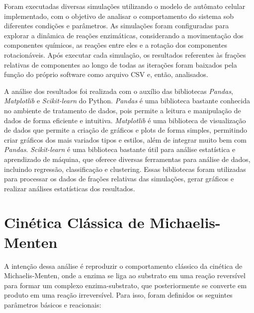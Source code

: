 \documentclass[12pt,oneside]{report}
\begin{document}
Foram executadas diversas simulações utilizando o modelo de autômato celular implementado, com o objetivo de analisar o comportamento do sistema sob diferentes condições e parâmetros. As simulações foram configuradas para explorar a dinâmica de reações enzimáticas, considerando a movimentação dos componentes químicos, as reações entre eles e a rotação dos componentes rotacionáveis. Após executar cada simulação, os resultados referentes às frações relativas de componentes ao longo de todas as iterações foram baixados pela função do próprio software como arquivo CSV e, então, analisados.

A análise dos resultados foi realizada com o auxílio das bibliotecas \textit{Pandas}, \textit{Matplotlib} e \textit{Scikit-learn} do Python. \textit{Pandas} é uma biblioteca bastante conhecida no ambiente de tratamento de dados, pois permite a leitura e manipulação de dados de forma eficiente e intuitiva. \textit{Matplotlib} é uma biblioteca de visualização de dados que permite a criação de gráficos e plots de forma simples, permitindo criar gráficos dos mais variados tipos e estilos, além de integrar muito bem com \textit{Pandas}. \textit{Scikit-learn} é uma biblioteca bastante útil para análise estatística e aprendizado de máquina, que oferece diversas ferramentas para análise de dados, incluindo regressão, classificação e clustering. Essas bibliotecas foram utilizadas para processar os dados de frações relativas das simulações, gerar gráficos e realizar análises estatísticas dos resultados.

\section{Cinética Clássica de Michaelis-Menten}

A intenção dessa análise é reproduzir o comportamento clássico da cinética de Michaelis-Menten, onde a enzima se liga ao substrato em uma reação reversível para formar um complexo enzima-substrato, que posteriormente se converte em produto em uma reação irreversível. Para isso, foram definidos os seguintes parâmetros básicos e reacionais:
\end{document}
